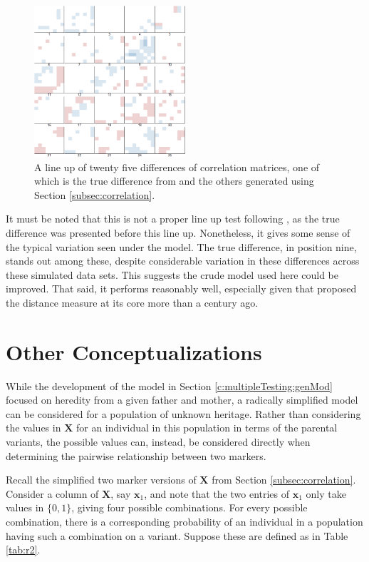 \documentclass{article}
\newcommand{\ve}[1]{\mathbf{#1}}           %
\newcommand{\m}[1]{\mathbf{#1}}               %
\begin{document}
\begin{figure}[htp]
  \begin{center}
    \includegraphics[width = 0.5\textwidth]{./img/lineup.png}
  \end{center}
  \caption{A line up of twenty five differences of correlation matrices, one of which is the true difference from \cite{cheverudetal2001} and the others generated using Section \ref{subsec:correlation}.}
  \label{fig:lineup}
\end{figure}

It must be noted that this is not a proper line up test following \cite{bujaetal2009}, as the true difference was presented before this line up. Nonetheless, it gives some sense of the typical variation seen under the model. The true difference, in position nine, stands out among these, despite considerable variation in these differences across these simulated data sets. This suggests the crude model used here could be improved. That said, it performs reasonably well, especially given that \cite{haldane1919} proposed the distance measure at its core more than a century ago.

\section{Other Conceptualizations} \label{sec:apply}

While the development of the model in Section \ref{c:multipleTesting:genMod} focused on heredity from a given father and mother, a radically simplified model can be considered for a population of unknown heritage. Rather than considering the values in $\m{X}$ for an individual in this population in terms of the parental variants, the possible values can, instead, be considered directly when determining the pairwise relationship between two markers.

Recall the simplified two marker versions of $\m{X}$ from Section \ref{subsec:correlation}. Consider a column of $\m{X}$, say $\ve{x}_1$, and note that the two entries of $\ve{x}_1$ only take values in $\{0,1\}$, giving four possible combinations. For every possible combination, there is a corresponding probability of an individual in a population having such a combination on a variant. Suppose these are defined as in Table \ref{tab:r2}.
\end{document}
